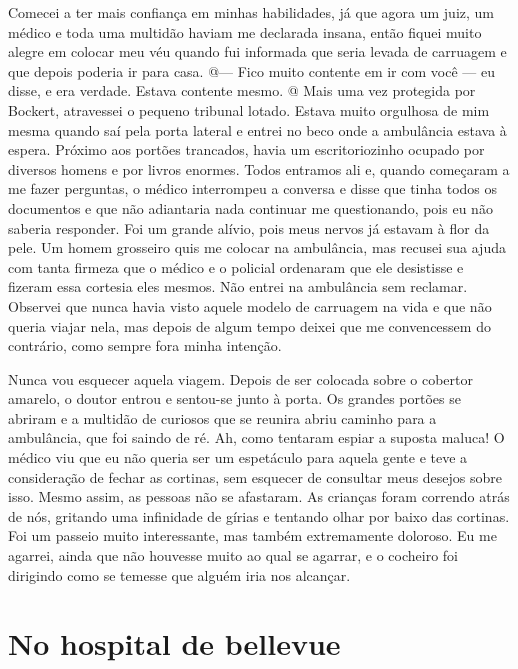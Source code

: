 Comecei a ter mais confiança em minhas habilidades, já que agora um
juiz, um médico e toda uma multidão haviam me declarada insana, então
fiquei muito alegre em colocar meu véu quando fui informada que seria
levada de carruagem e que depois poderia ir para casa. @--- Fico muito
contente em ir com você --- eu disse, e era verdade. Estava contente
mesmo. @ Mais uma vez protegida por Bockert, atravessei o pequeno
tribunal lotado. Estava muito orgulhosa de mim mesma quando saí pela
porta lateral e entrei no beco onde a ambulância estava à espera.
Próximo aos portões trancados, havia um escritoriozinho ocupado por
diversos homens e por livros enormes. Todos entramos ali e, quando
começaram a me fazer perguntas, o médico interrompeu a conversa e disse
que tinha todos os documentos e que não adiantaria nada continuar me
questionando, pois eu não saberia responder. Foi um grande alívio, pois
meus nervos já estavam à flor da pele. Um homem grosseiro quis me
colocar na ambulância, mas recusei sua ajuda com tanta firmeza que o
médico e o policial ordenaram que ele desistisse e fizeram essa cortesia
eles mesmos. Não entrei na ambulância sem reclamar. Observei que nunca
havia visto aquele modelo de carruagem na vida e que não queria viajar
nela, mas depois de algum tempo deixei que me convencessem do contrário,
como sempre fora minha intenção.

Nunca vou esquecer aquela viagem. Depois de ser colocada sobre o
cobertor amarelo, o doutor entrou e sentou-se junto à porta. Os grandes
portões se abriram e a multidão de curiosos que se reunira abriu caminho
para a ambulância, que foi saindo de ré. Ah, como tentaram espiar a
suposta maluca! O médico viu que eu não queria ser um espetáculo para
aquela gente e teve a consideração de fechar as cortinas, sem esquecer
de consultar meus desejos sobre isso. Mesmo assim, as pessoas não se
afastaram. As crianças foram correndo atrás de nós, gritando uma
infinidade de gírias e tentando olhar por baixo das cortinas. Foi um
passeio muito interessante, mas também extremamente doloroso. Eu me
agarrei, ainda que não houvesse muito ao qual se agarrar, e o cocheiro
foi dirigindo como se temesse que alguém iria nos alcançar.

\label{section-3}

\chapter{No hospital de
bellevue}\label{capuxedtulo-vi-no-hospital-de-bellevue}

